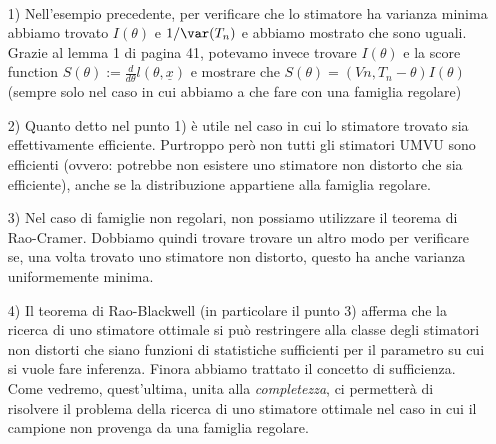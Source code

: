 \begin{oss}

~\begin{enumerate}
\item[1)] Nell'esempio precedente, per verificare che lo stimatore ha varianza minima abbiamo trovato $I(\theta)$ e $1/\var(T_n)$ e abbiamo mostrato che sono uguali. Grazie al lemma 1 di pagina 41, potevamo invece trovare $I(\theta)$ e la score function $S(\theta):= \frac{d}{d\theta} l(\theta,\underline{x})$ e mostrare che $S(\theta)=(V{n,T_n}-\theta) I(\theta)$ (sempre solo nel caso in cui abbiamo a che fare con una famiglia regolare)
\item[2)] Quanto detto nel punto 1) è utile nel caso in cui lo stimatore trovato sia effettivamente efficiente. Purtroppo però non tutti gli stimatori UMVU sono efficienti (ovvero: potrebbe non esistere uno stimatore non distorto che sia efficiente), anche se la distribuzione appartiene alla famiglia regolare.
\item[3)] Nel caso di famiglie non regolari, non possiamo utilizzare il teorema di Rao-Cramer. Dobbiamo quindi trovare trovare un altro modo per verificare se, una volta trovato uno stimatore non distorto, questo ha anche varianza uniformemente minima.
\item[4)] Il teorema di Rao-Blackwell (in particolare il punto 3) afferma che la ricerca di uno stimatore ottimale si può restringere alla classe degli stimatori non distorti che siano funzioni di statistiche sufficienti per il parametro su cui si vuole fare inferenza. Finora abbiamo trattato il concetto di sufficienza. Come vedremo, quest'ultima, unita alla \emph{completezza}, ci permetterà di risolvere il problema della ricerca di uno stimatore ottimale nel caso in cui il campione non provenga da una famiglia regolare.
\end{enumerate}
\end{oss}

